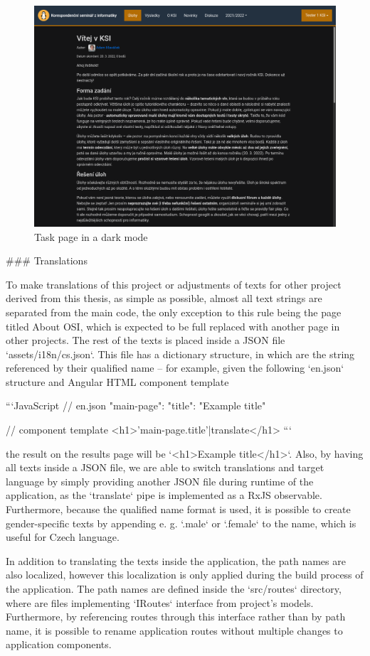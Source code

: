\documentclass[
  digital, %
  oneside, %
  lof,     %
  lot,     %
]{fithesis4}
\begin{document}
{\begin{figure}
\includegraphics[width=.8\textwidth]{assets/img/dark-mode}
\caption{Task page in a dark mode}
\label{fig:dark-mode}
\end{figure}


### Translations
\label{chap:translations}

To make translations of this project or adjustments of texts for other project derived from this thesis, as simple as possible, almost all text strings are separated from the main code, the only exception to this rule being the page titled About OSI, which is expected to be full replaced with another page in other projects. The rest of the texts is placed inside a JSON file `assets/i18n/cs.json`. This file has a dictionary structure, in which are the string referenced by their qualified name -- for example, given the following `en.json` structure and Angular HTML component template

```JavaScript
// en.json
{
	"main-page": {
		"title": "Example title"
	}
}

// component template
<h1>{{'main-page.title'|translate}}</h1>
```

the result on the results page will be `<h1>Example title</h1>`. Also, by having all texts inside a JSON file, we are able to switch translations and target language by simply providing another JSON file during runtime of the application, as the `translate` pipe is implemented as a RxJS observable. Furthermore, because the qualified name format is used, it is possible to create gender-specific texts by appending e. g. `.male` or `.female` to the name, which is useful for Czech language.

In addition to translating the texts inside the application, the path names are also localized, however this localization is only applied during the build process of the application. The path names are defined inside the `src/routes` directory, where are files implementing `IRoutes` interface from project's models. Furthermore, by referencing routes through this interface rather than by path name, it is possible to rename application routes without multiple changes to application components.

}
\end{document}
